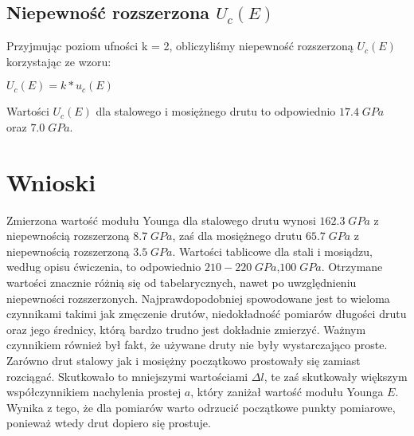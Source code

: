 \documentclass[12pt]{article}
\begin{document}
\subsection{Niepewność rozszerzona $U_c(E)$}
Przyjmując poziom ufności k = 2, obliczyliśmy niepewność rozszerzoną $U_c(E)$ korzystając ze wzoru:
\begin{center}
\LARGE $ U_c(E) = k * u_c(E)  $
\end{center}
Wartości $U_c(E)$ dla stalowego i mosiężnego drutu to odpowiednio $17.4\;GPa$ oraz $7.0\;GPa$.
\section{Wnioski}
Zmierzona wartość modułu Younga dla stalowego drutu wynosi $162.3\;GPa$ z niepewnością rozszerzoną $8.7\;GPa$, zaś dla mosiężnego drutu $65.7\;GPa$ z niepewnością rozszerzoną $3.5\;GPa$. Wartości tablicowe dla stali i mosiądzu, według opisu ćwiczenia, to odpowiednio $210-220\;GPa$,$100\;GPa$. Otrzymane wartości znacznie różnią się od tabelarycznych, nawet po uwzględnieniu niepewności rozszerzonych. Najprawdopodobniej spowodowane jest to wieloma czynnikami takimi jak zmęczenie drutów, niedokładność pomiarów długości drutu oraz jego średnicy, którą bardzo trudno jest dokładnie zmierzyć. Ważnym czynnikiem również był fakt, że używane druty nie były wystarczająco proste. Zarówno drut stalowy jak i mosiężny początkowo prostowały się zamiast rozciągać. Skutkowało to mniejszymi wartościami $\Delta{l}$, te zaś skutkowały większym współczynnikiem nachylenia prostej $a$, który zaniżał wartość modułu Younga $E$. Wynika z tego, że dla pomiarów warto odrzucić początkowe punkty pomiarowe, ponieważ wtedy drut dopiero się prostuje.
\end{document}
